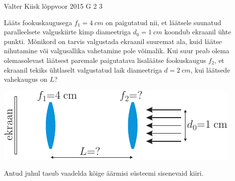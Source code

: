 {Valter Kiisk} %
{lõppvoor} %
{2015} %
{G 2} %
{3} %
{
\ifStatement
Lääts fookuskaugusega $f_1=\SI{4}{cm}$ on paigutatud nii, et läätsele suunatud paralleelsete valguskiirte kimp diameetriga $d_0=\SI{1}{cm}$ koondub ekraanil ühte punkti. Mõnikord on tarvis valgustada ekraanil suuremat ala, kuid läätse nihutamine või valgusallika vahetamine pole võimalik. Kui suur peab olema olemasolevast läätsest paremale paigutatava lisaläätse fookuskaugus $f_2$, et ekraanil tekiks ühtlaselt valgustatud laik diameetriga $d=\SI{2}{cm}$, kui läätsede vahekaugus on $L$?
\begin{center}
\includegraphics[scale=1.5]{2015-v3g-02-valgustamine-yles}
\end{center}
\fi


\ifHint
Antud juhul tasub vaadelda kõige äärmisi süsteemi sisenevaid kiiri.
\fi


}
